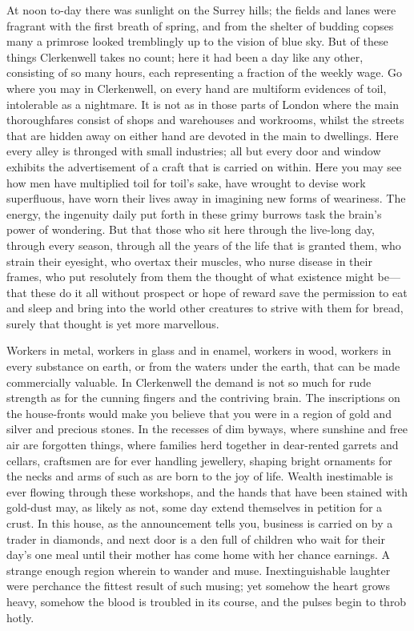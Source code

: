 At noon to-day there was sunlight on the Surrey hills; the fields and
lanes were fragrant with the first breath of spring, and from the
shelter of budding copses many a primrose looked tremblingly up to the
vision of blue sky. But of these things Clerkenwell takes no count; here
it had been a day like any other, consisting of so many hours, each
representing a fraction of the weekly wage. Go where you may in
Clerkenwell, on every hand are multiform evidences of toil, intolerable
as a nightmare. It is not as in those parts of London where the main
thoroughfares consist of shops and warehouses and
{\protect\hypertarget{25}{}{}}workrooms, whilst the streets that are
hidden away on either hand are devoted in the main to dwellings. Here
every alley is thronged with small industries; all but every door and
window exhibits the advertisement of a craft that is carried on within.
Here you may see how men have multiplied toil for toil's sake, have
wrought to devise work superfluous, have worn their lives away in
imagining new forms of weariness. The energy, the ingenuity daily put
forth in these grimy burrows task the brain's power of wondering. But
that those who sit here through the live-long day, through every season,
through all the years of the life that is granted them, who strain their
eyesight, who overtax their muscles, who nurse disease in their frames,
who put resolutely from them the thought of what existence might
be---that these do it all without prospect or hope of reward save the
permission to eat and sleep and bring into the world other creatures to
strive with them for bread, surely that thought is yet more marvellous.

{\protect\hypertarget{26}{}{}}Workers in metal, workers in glass and in
enamel, workers in wood, workers in every substance on earth, or from
the waters under the earth, that can be made commercially valuable. In
Clerkenwell the demand is not so much for rude strength as for the
cunning fingers and the contriving brain. The inscriptions on the
house-fronts would make you believe that you were in a region of gold
and silver and precious stones. In the recesses of dim byways, where
sunshine and free air are forgotten things, where families herd together
in dear-rented garrets and cellars, craftsmen are for ever handling
jewellery, shaping bright ornaments for the necks and arms of such as
are born to the joy of life. Wealth inestimable is ever flowing through
these workshops, and the hands that have been stained with gold-dust
may, as likely as not, some day extend themselves in petition for a
crust. In this house, as the announcement tells you, business is carried
on by a trader in diamonds, and next door is a den full of children who
wait for their day's one meal {\protect\hypertarget{27}{}{}}until their
mother has come home with her chance earnings. A strange enough region
wherein to wander and muse. Inextinguishable laughter were perchance the
fittest result of such musing; yet somehow the heart grows heavy,
somehow the blood is troubled in its course, and the pulses begin to
throb hotly.

